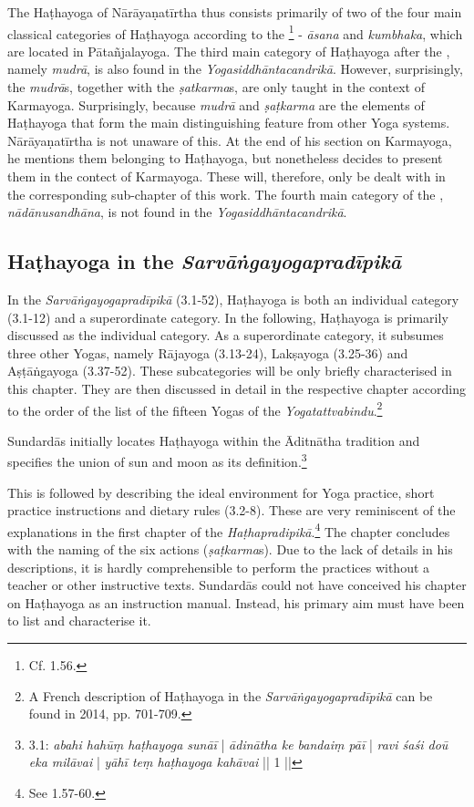 The Haṭhayoga of Nārāyaṇatīrtha thus consists primarily of two of the four main classical categories of Haṭhayoga according to the \footnote{Cf.  1.56.} - \textit{āsana} and \textit{kumbhaka}, which are located in Pātañjalayoga. The third main category of Haṭhayoga after the , namely \textit{mudrā}, is also found in the \textit{Yogasiddhāntacandrikā}. However, surprisingly, the \textit{mudrā}s, together with the \textit{ṣatkarma}s, are only taught in the context of Karmayoga. Surprisingly, because \textit{mudrā} and \textit{ṣaṭkarma} are the elements of Haṭhayoga that form the main distinguishing feature from other Yoga systems. Nārāyaṇatīrtha is not unaware of this. At the end of his section on Karmayoga, he mentions them belonging to Haṭhayoga, but nonetheless decides to present them in the contect of Karmayoga. These will, therefore, only be dealt with in the corresponding sub-chapter of this work. The fourth main category of the , \textit{nādānusandhāna}, is not found in the \textit{Yogasiddhāntacandrikā}.

\subsection{Haṭhayoga in the \textit{Sarvāṅgayogapradīpikā}}

In the \textit{Sarvāṅgayogapradīpikā} (3.1-52), Haṭhayoga is both an individual category (3.1-12) and a superordinate category. In the following, Haṭhayoga is primarily discussed as the individual category. As a superordinate category, it subsumes three other Yogas, namely Rājayoga (3.13-24), Lakṣayoga (3.25-36) and Aṣṭāṅgayoga (3.37-52). These subcategories will be only briefly characterised in this chapter. They are then discussed in detail in the respective chapter according to the order of the list of the fifteen Yogas of the \textit{Yogatattvabindu}.\footnote{A French description of Haṭhayoga in the \textit{Sarvāṅgayogapradīpikā} can be found in \citeauthor{burger2014sarvangayogapradipika} 2014, pp. 701-709.}

Sundardās initially locates Haṭhayoga within the Āditnātha tradition and specifies the union of sun and moon as its definition.\footnote{ 3.1: \textit{abahi hahūṃ haṭhayoga sunāī} | \textit{ādinātha ke bandaiṃ pāī} | \textit{ravi śaśi doū eka milāvai} | \textit{yāhī teṃ haṭhayoga kahāvai} || 1 ||}

This is followed by describing the ideal environment for Yoga practice, short practice instructions and dietary rules (3.2-8). These are very reminiscent of the explanations in the first chapter of the \textit{Haṭhapradipikā}.\footnote{See  1.57-60.} The chapter concludes with the naming of the six actions (\textit{ṣaṭkarma}s). Due to the lack of details in his descriptions, it is hardly comprehensible to perform the practices without a teacher or other instructive texts. Sundardās could not have conceived his chapter on Haṭhayoga as an instruction manual. Instead, his primary aim must have been to list and characterise it.


